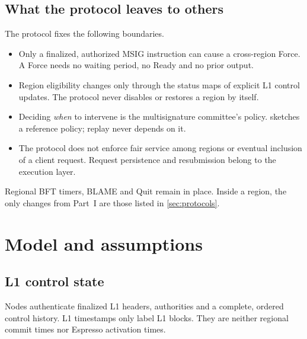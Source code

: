 \documentclass[11pt,a4paper]{article}
\newcounter{protocol}
\begin{document}
\subsection{What the protocol leaves to others}
\label{sec:scope}
The protocol fixes the following boundaries.
\begin{itemize}
\item Only a finalized, authorized MSIG instruction can cause a
cross-region Force. A Force needs no waiting period, no Ready and no
prior output.
\item Region eligibility changes only through the status maps of
explicit L1 control updates. The protocol never disables or restores a region by itself.
\item Deciding \emph{when} to intervene is the multisignature
committee's policy.  sketches a reference policy;
replay never depends on it.
\item The protocol does not enforce fair service among regions or
eventual inclusion of a client request. Request persistence and
resubmission belong to the execution layer.
\end{itemize}
Regional BFT timers, BLAME and Quit remain in place. Inside a region,
the only changes from Part~I are those listed in \cref{sec:protocols}.

\section{Model and assumptions}
\label{sec:model}
\subsection{L1 control state}
\label{sec:l1}
Nodes authenticate finalized L1 headers, authorities and a complete,
ordered control history. L1 timestamps only label L1 blocks. They are
neither regional commit times nor Espresso activation times.
\end{document}

